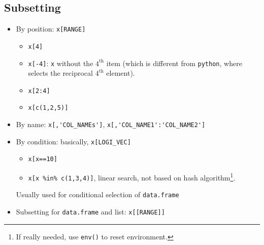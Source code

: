 \subsection{Subsetting}
\begin{itemize}[topsep=2pt,itemsep=0pt]
    \item By position: \lstinline|x[RANGE]|
    \begin{itemize}[topsep=2pt,itemsep=0pt]
        \item \lstinline|x[4]|
        \item \lstinline|x[-4]|: \lstinline|x| without the $ 4^\mathrm{th} $ item (which is different from \lstinline|python|, where selects the  reciprocal $ \mathrm{4^{th}}  $ element).
        \item \lstinline|x[2:4]|
        \item \lstinline|x[c(1,2,5)]|
    \end{itemize}
    \item By name: \lstinline|x[,'COL_NAMEs']|, \lstinline|x[,'COL_NAME1':'COL_NAME2']|
    \item By condition: basically, \lstinline|x[LOGI_VEC]|
    \begin{itemize}[topsep=2pt,itemsep=0pt]
        \item \lstinline|x[x==10]|
        \item \lstinline|x[x %in% c(1,3,4)]|, linear search, not based on hash algorithm\footnote{If really needed, use \lstinline|env()| to reset environment.}.
    \end{itemize}

    Usually used for conditional selection of \lstinline|data.frame|
    \item Subsetting for \lstinline|data.frame| and list: \lstinline|x[[RANGE]]|



\end{itemize}
